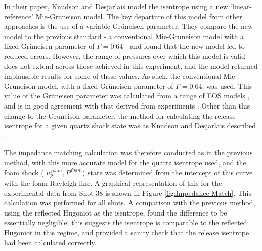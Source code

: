 In their paper, Knudson and Desjarlais model the isentrope using a new `linear-reference' Mie-Gruneison model. The key departure of this model from other approaches is the use of a variable Gr{\"u}neisen parameter. They compare the new model to the previous standard - a conventional Mie-Gruneison model with a fixed Gr{\"u}neisen parameter of $\Gamma = 0.64$ - and found that the new model led to reduced errors. However, the range of pressures over which this model is valid does not extend across those achieved in this experiment, and the model  returned implausible results for some of these values. As such, the conventional Mie-Gruneison model, with a fixed Gr{\"u}neisen parameter of $\Gamma = 0.64$, was used. This value of the Gr{\"u}neisen parameter was calculated from a range of EOS models \cite{Hicks2008}, and is in good agreement with that derived \cite{Hicks2008} from experiments \cite{Hicks2005, Trunin1994}. Other than this change to the Gruneison parameter, the method for calculating the release isentrope for a given quartz shock state was as Knudson and Desjarlais described \cite{Knudson2013}.

The impedance matching calculation was therefore conducted as in the previous method, with this more accurate model for the quartz isentrope used, and the foam shock ( $u_p^{foam}, P^{foam}$) state was determined from the intercept of this curve with the foam Rayleigh line. A graphical representation of this for the experimental data from Shot 38 is shown in Figure \ref{fig:Impedance Match}. This calculation was performed for all shots. A comparison with the previous method, using the reflected Hugoniot as the isentrope, found the difference to be essentially negligible; this suggests the isentrope is comparable to the reflected Hugoniot in this regime, and provided a sanity check that the release isentrope had been calculated correctly.


